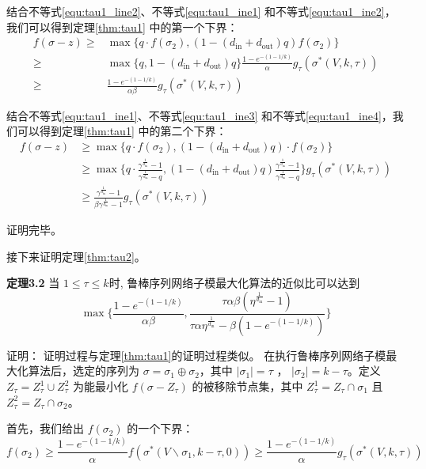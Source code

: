 结合不等式\ref{equ:tau1_line2}、不等式\ref{equ:tau1_ine1} 和不等式\ref{equ:tau1_ine2}，我们可以得到定理\ref{thm:tau1} 中的第一个下界：
\begin{align}
    f(\sigma -z ) \ge & \max\{ q \cdot f(\sigma_2),(1-(d_{\text{in}} + d_{\text{out}})q) f(\sigma_2)\} \\
    \ge & \max\{q,1-(d_{\text{in}} + d_{\text{out}})q\} \frac{1-e^{-(1-1/k)}}{\alpha} g_\tau(\sigma^*(V,k,\tau)) \\
    \ge & \frac{1-e^{-(1-1/k)}}{\alpha\beta} g_\tau(\sigma^*(V,k,\tau))
\end{align}

结合不等式\ref{equ:tau1_ine1}、不等式\ref{equ:tau1_ine3} 和不等式\ref{equ:tau1_ine4}，我们可以得到定理\ref{thm:tau1} 中的第二个下界：
\begin{align}
     f(\sigma -z ) & \ge \max\{ q \cdot f(\sigma_2),(1-(d_{\text{in}} + d_{\text{out}})q) \cdot f(\sigma_2)\} \\
    & \ge \max\{ q \cdot \frac{\gamma^{\frac{1}{d_{\text{in}}}}-1}{\gamma^{\frac{1}{d_{\text{in}}}}-q} , (1-(d_{\text{in}} + d_{\text{out}})q) \frac{\gamma^{\frac{1}{d_{\text{in}}}}-1}{\gamma^{\frac{1}{d_{\text{in}}}}-q} \} g_\tau(\sigma^*(V,k,\tau)) \\
    & \ge \frac{\gamma^{\frac{1}{d_{\text{in}}}}-1}{\beta \gamma^{\frac{1}{d_{\text{in}}}}-1} g_\tau(\sigma^*(V,k,\tau))
\end{align}

\noindent 证明完毕。


接下来证明定理\ref{thm:tau2}。

\noindent \textbf{定理3.2} 当 $1\le \tau \le k$时, 鲁棒序列网络子模最大化算法的近似比可以达到
\begin{equation*}
 \max\{\frac{1-e^{-(1-1/k)}}{\alpha\beta},\frac{\tau\alpha\beta(\eta^{\frac{1}{d_{\text{in}}}}-1)}{\tau\alpha\eta^{\frac{1}{d_{\text{in}}}}- \beta (1-e^{-(1-1/k)}) }\}   
\end{equation*}

\noindent 证明：
证明过程与定理\ref{thm:tau1}的证明过程类似。
在执行鲁棒序列网络子模最大化算法后，选定的序列为 $\sigma=\sigma_1 \oplus \sigma_2$，其中 $|\sigma_1|=\tau$ ， $|\sigma_2|=k-\tau$。定义 $Z_{\tau} = Z_{\tau}^1 \cup Z_{\tau}^2$ 为能最小化 $f(\sigma-Z_{\tau})$ 的被移除节点集，其中 $Z_{\tau}^1 = Z_{\tau} \cap \sigma_1$ 且 $Z_{\tau}^2 = Z_{\tau} \cap \sigma_2$。

首先，我们给出 $f(\sigma_2)$ 的一个下界：
\begin{equation}
    f(\sigma_2) \ge \frac{1-e^{-(1-1/k)}}{\alpha} f(\sigma^*(V\backslash \sigma_1,k-\tau,0)) \ge \frac{1-e^{-(1-1/k)}}{\alpha} g_\tau(\sigma^*(V,k,\tau)) \label{equ:tau2_line1}
\end{equation}

